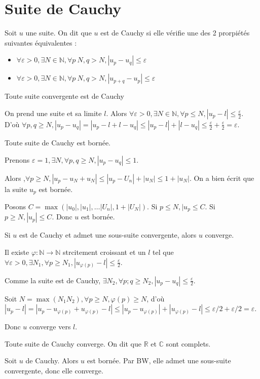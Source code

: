 \documentclass[french]{yLectureNote}
\newcommand{\N}[0]{\mathbb{N}}
\newcommand{\R}[0]{\mathbb{R}}
\newcommand{\C}[0]{\mathbb{C}}
\begin{document}
\section{Suite de Cauchy}
\begin{definition}
Soit $u$ une suite. On dit que $u$ est de Cauchy si elle vérifie une des 2 prorpiétés suivantes équivalentes :
\begin{itemize}
 \item $\forall \varepsilon>0, \exists N\in\N, \forall p\>N, q>N, |u_p-u_q|\leq\varepsilon$
  \item $\forall \varepsilon>0, \exists N\in\N, \forall p\>N, q>N, |u_{p+q}-u_p|\leq\varepsilon$
\end{itemize}
\end{definition}
\begin{proposition}
Toute suite convergente est de Cauchy
\end{proposition}
\begin{myproof}
On prend une suite et sa limite $l$. Alors $\forall \varepsilon >0, \exists N\in\N, \forall p\leq N, |u_p-l| \leq \frac{\varepsilon}{2}$. D'où $\forall p,q\geq N, |u_p-u_q| = |u_p-l+l-u_q| \leq |u_p-l|+|l-u_q| \leq \frac{\varepsilon}{2} + \frac{\varepsilon}{2} = \varepsilon$.
\end{myproof}
\begin{proposition}
Toute suite de Cauchy est bornée.
\end{proposition}
\begin{myproof}
Prenons $\varepsilon = 1, \exists N,\forall p,q\geq N, |u_p-u_q|\leq 1$.

Alors ,$\forall p\geq N, |u_p-u_N+u_N|\leq |u_p-U_n|+|u_N|\leq 1 + |u_N|$. On a bien écrit que la suite $u_p$ est bornée.

Posons $C=\max(|u_0|,|u_1|,\dots|U_n|, 1+|U_N|)$. Si $p\leq N, |u_p \leq C$. Si $p\geq N, |u_p|\leq C$. Donc $u$ est bornée.
\end{myproof}
\begin{proposition}
Si $u$ est de Cauchy et admet une sous-suite convergente, alors $u$ converge.
\end{proposition}
\begin{myproof}
Il existe $\varphi : \N \to \N$ strcitement croissant et un $l$ tel que $\forall \varepsilon >0,\exists N_1,\forall p\geq N_1, |u_{\varphi(p)}-l|\leq \frac{\varepsilon}{2}$.

Comme la suite est de Cauchy, $\exists N_2,\forall p;q\geq N_2,|u_p-u_q|\leq \frac{\varepsilon}{2}$.

Soit $N = \max(N_1N_2),\forall p\geq N,\varphi(p)\geq N$, d'où $|u_p-l| = |u_p-u_{\varphi(p)}+u_{\varphi(p)}-l| \leq |u_p-u_{\varphi(p)}| + |u_{\varphi(p)}-l| \leq \varepsilon/2 + \varepsilon/2 = \varepsilon$.

Donc $u$ converge vers $l$.
\end{myproof}
\begin{theorem}
 Toute suite de Cauchy converge. On dit que $\R$ et $\C$ sont complets.
\end{theorem}
\begin{myproof}
Soit $u$ de Cauchy. Alors $u$ est bornée. Par BW, elle admet une sous-suite convergente, donc elle converge.
\end{myproof}
\end{document}

